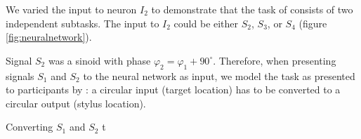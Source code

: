 \documentclass[]{article}
\begin{document}
We varied the input to neuron $I_2$ to demonstrate that the  task of \citet{Annand2020} consists of two independent subtasks. The input to $I_2$ could be either $S_2$, $S_3$, or $S_4$ (figure \ref{fig:neuralnetwork}).

Signal $S_2$ was a sinoid with phase  $ \varphi_2 = \varphi_1 + 90^\circ$. Therefore, when presenting signals $S_1$ and $S_2$ to the neural network as input, we model the task as presented to participants by \citet{Annand2020}: a circular input (target location) has to be converted to a circular output (stylus location). 

Converting $S_1$ and $S_2$ t



    



\end{document}
